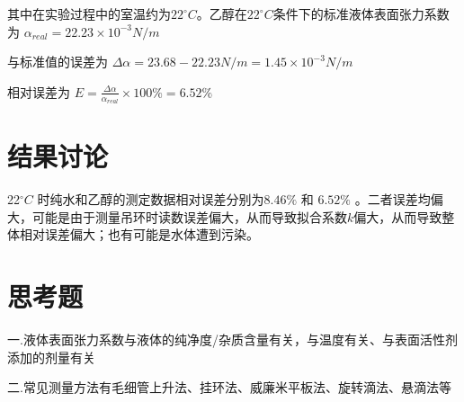 \documentclass[UTF8]{ctexart}
\begin{document}
其中在实验过程中的室温约为$22^{\circ}C$。乙醇在$22^{\circ}C$条件下的标准液体表面张力系数为 $\alpha_{real} = 22.23 \times 10^{-3} N/m$

与标准值的误差为 $\Delta \alpha = 23.68 - 22.23 N/m = 1.45 \times 10^{-3} N/m$

相对误差为  $E=\frac{\Delta \alpha}{\alpha_{real}}\times 100\% = 6.52\%$
\section{结果讨论}
22$^{\circ}C$ 时纯水和乙醇的测定数据相对误差分别为$8.46\%$ 和 $6.52\%$ 。二者误差均偏大，可能是由于测量吊环时读数误差偏大，从而导致拟合系数$k$偏大，从而导致整体相对误差偏大；也有可能是水体遭到污染。

\section{思考题}
一.液体表面张力系数与液体的纯净度/杂质含量有关，与温度有关、与表面活性剂添加的剂量有关

二.常见测量方法有毛细管上升法、挂环法、威廉米平板法、旋转滴法、悬滴法等
\end{document}
